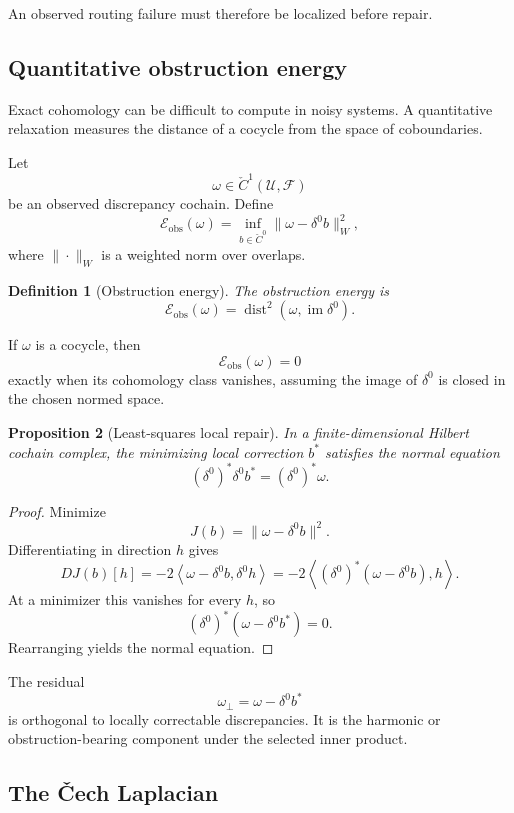 \documentclass[11pt]{article}
\newtheorem{definition}{Definition}[section]
\newtheorem{proposition}[definition]{Proposition}
\theoremstyle{definition}
\DeclareMathOperator{\im}{im}
\begin{document}
An observed routing failure must therefore be localized before repair.

\subsection{Quantitative obstruction energy}

Exact cohomology can be difficult to compute in noisy systems. A quantitative relaxation measures the distance of a cocycle from the space of coboundaries.

Let
\[
\omega\in\check C^1(\mathcal U,\mathscr F)
\]
be an observed discrepancy cochain. Define
\[
\mathcal E_{\mathrm{obs}}(\omega)
=
\inf_{b\in\check C^0}
\|
\omega-\delta^0b
\|^2_W,
\]
where \(\|\cdot\|_W\) is a weighted norm over overlaps.

\begin{definition}[Obstruction energy]
The obstruction energy is
\[
\mathcal E_{\mathrm{obs}}(\omega)
=
\operatorname{dist}^2
\left(
\omega,
\im\delta^0
\right).
\]
\end{definition}

If \(\omega\) is a cocycle, then
\[
\mathcal E_{\mathrm{obs}}(\omega)=0
\]
exactly when its cohomology class vanishes, assuming the image of \(\delta^0\) is closed in the chosen normed space.

\begin{proposition}[Least-squares local repair]
In a finite-dimensional Hilbert cochain complex, the minimizing local correction \(b^{*}\) satisfies the normal equation
\[
(\delta^0)^{*}\delta^0b^{*}
=
(\delta^0)^{*}\omega.
\]
\end{proposition}

\begin{proof}
Minimize
\[
J(b)
=
\|\omega-\delta^0b\|^2.
\]
Differentiating in direction \(h\) gives
\[
DJ(b)[h]
=
-2
\left\langle
\omega-\delta^0b,
\delta^0h
\right\rangle
=
-2
\left\langle
(\delta^0)^{*}
(\omega-\delta^0b),
h
\right\rangle.
\]
At a minimizer this vanishes for every \(h\), so
\[
(\delta^0)^{*}
(\omega-\delta^0b^{*})
=
0.
\]
Rearranging yields the normal equation.
\end{proof}

The residual
\[
\omega_{\perp}
=
\omega-\delta^0b^{*}
\]
is orthogonal to locally correctable discrepancies. It is the harmonic or obstruction-bearing component under the selected inner product.

\subsection{The Čech Laplacian}
\end{document}
